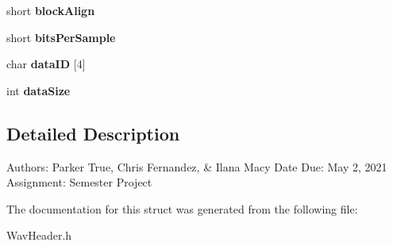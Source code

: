 \begin{DoxyCompactItemize}
\mbox{\label{structWavHeader_a1bfbf825695b7626f58e64355a3ee4b1}} 
short {\bfseries block\+Align}
\item 
\mbox{\label{structWavHeader_a2dbf27f9cd07e02e744d4f71bc25109b}} 
short {\bfseries bits\+Per\+Sample}
\item 
\mbox{\label{structWavHeader_ad0ff2115c45221d8a763356de04de028}} 
char {\bfseries data\+ID} \mbox{[}4\mbox{]}
\item 
\mbox{\label{structWavHeader_a501041ecccd8debd17d35e5d59844164}} 
int {\bfseries data\+Size}
\end{DoxyCompactItemize}


\subsection{Detailed Description}
Authors\+: Parker True, Chris Fernandez, \& Ilana Macy Date Due\+: May 2, 2021 Assignment\+: Semester Project 

The documentation for this struct was generated from the following file\+:\begin{DoxyCompactItemize}
\item 
Wav\+Header.\+h\end{DoxyCompactItemize}
